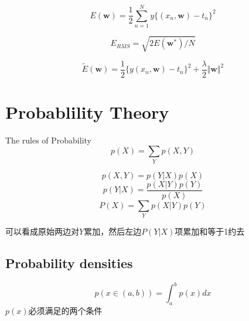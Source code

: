 \documentclass[cyan]{YuNote}
\begin{document}
\begin{equation}
E(\textbf{w}) =\dfrac{1}{2} \sum_{n=1}^N y \lbrace (x_n,\textbf{w})-t_n\rbrace^2
\end{equation}

\begin{equation}[Definition:$RMS$]
E_{RMS}=\sqrt{2E(\textbf{w}^*)/N}
\end{equation}

\begin{equation}
\tilde{E}(\textbf{w})=\dfrac{1}{2}\lbrace y(x_n,\textbf{w})-t_n\rbrace^2+\dfrac{\lambda}{2}\Vert\textbf{w}\Vert^2
\end{equation}
\section{Probablility Theory}
The rules of Probability
\begin{equation}[sum rule]
p(X)=\sum_Y p(X,Y)
\end{equation}

\begin{equation}[product rule]
p(X,Y)=p(Y|X)p(X)
\end{equation}
\begin{equation}[Bayes'theorem]
p(Y|X)=\dfrac{p(X|Y)p(Y)}{p(X)}
\end{equation}
\begin{equation}[贝叶斯推论]
P(X)=\sum _Y p(X|Y)p(Y)
\end{equation}
\begin{note}
可以看成原始两边对$Y$累加，然后左边$P(Y|X)$项累加和等于1约去
\end{note}
\subsection{Probability densities}
\begin{equation}[$x$上$(a,b)$区间内的概率密度]
p(x\in(a,b))=\int _a^b p(x)dx
\end{equation}
$p(x)$必须满足的两个条件\\
\end{document}
